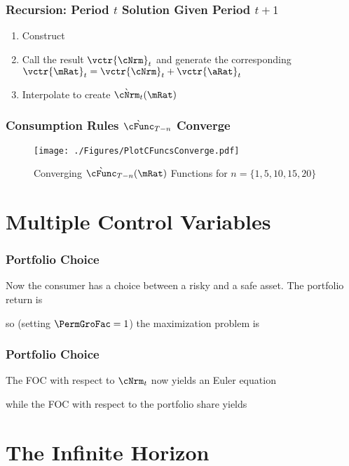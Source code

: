 \documentclass{beamer}
\begin{document}
\begin{frame}%
\frametitle{Recursion: Period $t$ Solution Given Period $t+1$}
\begin{enumerate}
\item Construct 

\item Call the result $\vctr{\cNrm}_{t}$ and generate the corresponding $\vctr{\mRat}_{t}=\vctr{\cNrm}_{t}+\vctr{\aRat}_{t}$
\item Interpolate to create $\grave{\cNrm}_{t}(\mRat)$
\end{enumerate}

\end{frame}

\begin{frame}%
\frametitle{Consumption Rules $\grave{\cFunc}_{T-n}$ Converge}

\begin{figure}
        \texttt{[image: ./Figures/PlotCFuncsConverge.pdf]}
        \caption{Converging $\grave{\cFunc}_{T-n}({\mRat})$ Functions for $n=\{1,5,10,15,20\}$}
        \label{fig:PlotCFuncsConverge}
\end{figure}

\end{frame}


\section{Multiple Control Variables}
\begin{frame}
\frametitle{Portfolio Choice}

Now the consumer has a choice between a risky and a safe asset.  \pause The portfolio
return is

\pause so (setting $\PermGroFac=1$) the maximization problem is \pause 


\end{frame}

\begin{frame}
\frametitle{Portfolio Choice}

The FOC with respect to $\cNrm_{t}$ now yields an Euler equation

\pause
while the FOC with respect to the portfolio share yields


\end{frame}

\section{The Infinite Horizon}
\end{document}
